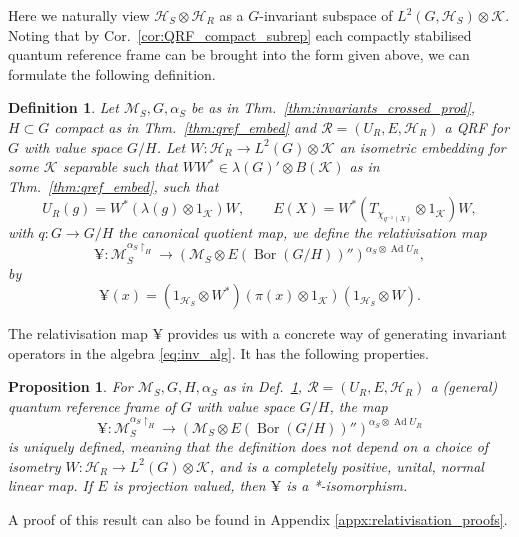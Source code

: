 \documentclass[sn-mathphys-num]{sn-jnl}%
\newcommand{\HH}{\mathcal{H}}
\newcommand{\KK}{\mathcal{K}}
\newcommand{\MM}{\mathcal{M}}
\DeclareMathOperator{\Bor}{Bor}
\DeclareMathOperator{\Ad}{Ad}
\numberwithin{equation}{section}
\theoremstyle{thmstyleone}%
\newtheorem{proposition}[theorem]{Proposition}%
\theoremstyle{thmstyletwo}%
\theoremstyle{thmstylethree}%
\newtheorem{definition}[theorem]{Definition}%
\begin{document}
    Here we naturally view $\HH_S\otimes\HH_R$ as a $G$-invariant subspace of $L^2(G,\HH_S)\otimes\KK$. Noting that by Cor.\ \ref{cor:QRF_compact_subrep} each compactly stabilised quantum reference frame can be brought into the form given above, we can formulate the following definition. 
    \begin{definition}
        \label{def:relativisation_compact_stab}
        Let $\MM_S,G,\alpha_S$ be as in Thm.\ \ref{thm:invariants_crossed_prod}, $H\subset G$ compact as in Thm.\ \ref{thm:qref_embed} and $\mathcal{R}=(U_R,E,\HH_R)$ a QRF for $G$ with value space $G/H$. Let $W:\HH_R\to L^2(G)\otimes \KK$ an isometric embedding for some $\KK$ separable such that $WW^*\in \lambda(G)'\otimes B(\KK)$ as in Thm.\ \ref{thm:qref_embed}, such that
        \begin{equation}
            U_R(g)=W^*(\lambda(g)\otimes 1_\KK) W,\qquad E(X)=W^*(T_{\chi_{q^{-1}(X)}}\otimes 1_\KK)W,
        \end{equation}
        with $q:G\to G/H$ the canonical quotient map, we define the \textup{relativisation map}
        \begin{equation}
\yen:\MM_S^{\alpha_S\restriction_H}\to (\MM_S\otimes E(\Bor(G/H))'')^{\alpha_S\otimes\Ad U_R},
        \end{equation}
        by
        \begin{equation}
            \label{eq:yenproj}
            \yen(x)=(1_{\HH_S}\otimes W^*)(\pi(x)\otimes1_\KK)(1_{\HH_S}\otimes W).
        \end{equation}
    \end{definition}
        

    The relativisation map $\yen$ provides us with a concrete way of generating invariant operators in the algebra \eqref{eq:inv_alg}. It has the following properties.
    \begin{proposition}
    \label{prop:yen_properties}
        For $\MM_S,G,H,\alpha_S$ as in Def.\ \ref{def:relativisation_compact_stab}, $\mathcal{R}=(U_R,E,\HH_R)$ a (general) quantum reference frame of $G$ with value space $G/H$, the map
        $$\yen:\MM_S^{\alpha_S\restriction_H}\to (\MM_S\otimes E(\Bor(G/H))'')^{\alpha_S\otimes\Ad U_R}$$
        is uniquely defined, meaning that the definition does not depend on a choice of isometry $W:\HH_R\to L^2(G)\otimes\KK$, and is a completely positive, unital, normal linear map. If $E$ is projection valued, then $\yen$ is a *-isomorphism.
    \end{proposition}
    A proof of this result can also be found in Appendix \ref{appx:relativisation_proofs}.
    
\end{document}
